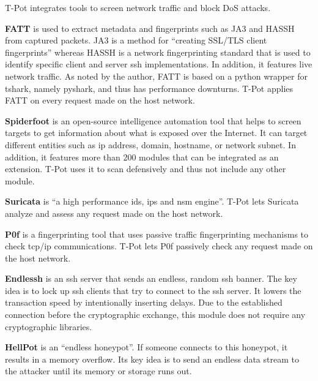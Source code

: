 T-Pot integrates tools to screen network traffic and block DoS attacks.

\textbf{FATT} \cite{fatt2021} is used to extract metadata and fingerprints such as JA3 \cite{ja32021} and HASSH \cite{hassh2021} from captured packets.
JA3 is a method for \enquote{creating SSL/TLS client fingerprints} whereas HASSH is a network fingerprinting standard that is used to identify specific client and server \ac{ssh} implementations.
In addition, it features live network traffic.
As noted by the author, FATT is based on a python wrapper for tshark, namely pyshark, and thus has performance downturns.
T-Pot applies FATT on every request made on the host network.

\textbf{Spiderfoot} \cite{spiderfoot2021} is an open-source intelligence automation tool that helps to screen targets to get information about what is exposed over the Internet.
It can target different entities such as \ac{ip} address, domain, hostname, or network subnet.
In addition, it features more than 200 modules that can be integrated as an extension.
T-Pot uses it to scan defensively and thus not include any other module.

\textbf{Suricata} \cite{suricata2021} is \enquote{a high performance \ac{ids}, \ac{ips} and \ac{nsm} engine}.
T-Pot lets Suricata analyze and assess any request made on the host network.

\textbf{P0f} \cite{p0f2021} is a fingerprinting tool that uses passive traffic fingerprinting mechanisms to check \ac{tcp}/\ac{ip} communications.
T-Pot lets P0f passively check any request made on the host network.

\textbf{Endlessh} \cite{endlessh2021} is an \ac{ssh} server that sends an endless, random \ac{ssh} banner.
The key idea is to lock up \ac{ssh} clients that try to connect to the \ac{ssh} server.
It lowers the transaction speed by intentionally inserting delays.
Due to the established connection before the cryptographic exchange, this module does not require any cryptographic libraries.

\textbf{HellPot} \cite{hellpot2021} is an \enquote{endless honeypot}.
If someone connects to this honeypot, it results in a memory overflow.
Its key idea is to send an endless data stream to the attacker until its memory or storage runs out.

